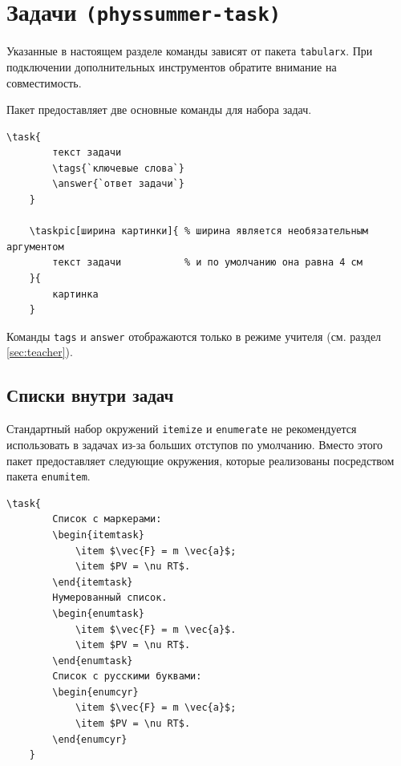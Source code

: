 \section{Задачи \texttt{(physsummer-task)}}

Указанные в настоящем разделе команды зависят от пакета \texttt{tabularx}. При подключении дополнительных
инструментов обратите внимание на совместимость.

Пакет предоставляет две основные команды для набора задач.

\begin{lstlisting}[gobble = 3]
    \task{
        текст задачи
        \tags{`ключевые слова`}
        \answer{`ответ задачи`}
    }

    \taskpic[ширина картинки]{ % ширина является необязательным аргументом
        текст задачи           % и по умолчанию она равна 4 см
    }{
        картинка
    }
\end{lstlisting}

Команды \texttt{tags} и \texttt{answer} отображаются только в режиме учителя (см. раздел
\ref{sec:teacher}).


        
\subsection{Списки внутри задач}

Стандартный набор окружений \texttt{itemize} и \texttt{enumerate} не рекомендуется использовать в
задачах из-за больших отступов по умолчанию. Вместо этого пакет предоставляет следующие окружения,
которые реализованы посредством пакета \texttt{enumitem}.

\begin{lstlisting}[gobble = 3]
    \task{
        Список с маркерами:
        \begin{itemtask}
            \item $\vec{F} = m \vec{a}$;
            \item $PV = \nu RT$.
        \end{itemtask}
        Нумерованный список.
        \begin{enumtask}
            \item $\vec{F} = m \vec{a}$.
            \item $PV = \nu RT$.
        \end{enumtask}
        Список с русскими буквами:
        \begin{enumcyr}
            \item $\vec{F} = m \vec{a}$;
            \item $PV = \nu RT$.
        \end{enumcyr}
    }
\end{lstlisting}

